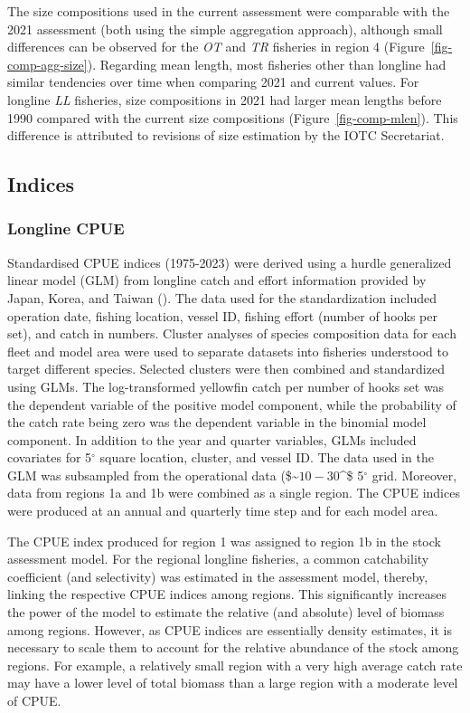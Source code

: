 \documentclass[
]{scrartcl}
\begin{document}
The size compositions used in the current assessment were comparable
with the 2021 assessment (both using the simple aggregation approach),
although small differences can be observed for the \emph{OT} and
\emph{TR} fisheries in region 4 (Figure~\ref{fig-comp-agg-size}).
Regarding mean length, most fisheries other than longline had similar
tendencies over time when comparing 2021 and current values. For
longline \emph{LL} fisheries, size compositions in 2021 had larger mean
lengths before 1990 compared with the current size compositions
(Figure~\ref{fig-comp-mlen}). This difference is attributed to revisions
of size estimation by the IOTC Secretariat.

\subsection{Indices}\label{indices}

\subsubsection{Longline CPUE}\label{sec-llcpue}

Standardised CPUE indices (1975-2023) were derived using a hurdle
generalized linear model (GLM) from longline catch and effort
information provided by Japan, Korea, and Taiwan
().
The data used for the standardization included operation date, fishing
location, vessel ID, fishing effort (number of hooks per set), and catch
in numbers. Cluster analyses of species composition data for each fleet
and model area were used to separate datasets into fisheries understood
to target different species. Selected clusters were then combined and
standardized using GLMs. The log-transformed yellowfin catch per number
of hooks set was the dependent variable of the positive model component,
while the probability of the catch rate being zero was the dependent
variable in the binomial model component. In addition to the year and
quarter variables, GLMs included covariates for 5\(^\circ\) square
location, cluster, and vessel ID. The data used in the GLM was
subsampled from the operational data (\$\sim\(10-30%
\)\^{}\circ \times\$ 5\(^\circ\) grid. Moreover, data from regions 1a
and 1b were combined as a single region. The CPUE indices were produced
at an annual and quarterly time step and for each model area.

The CPUE index produced for region 1 was assigned to region 1b in the
stock assessment model. For the regional longline fisheries, a common
catchability coefficient (and selectivity) was estimated in the
assessment model, thereby, linking the respective CPUE indices among
regions. This significantly increases the power of the model to estimate
the relative (and absolute) level of biomass among regions. However, as
CPUE indices are essentially density estimates, it is necessary to scale
them to account for the relative abundance of the stock among regions.
For example, a relatively small region with a very high average catch
rate may have a lower level of total biomass than a large region with a
moderate level of CPUE.
\end{document}
